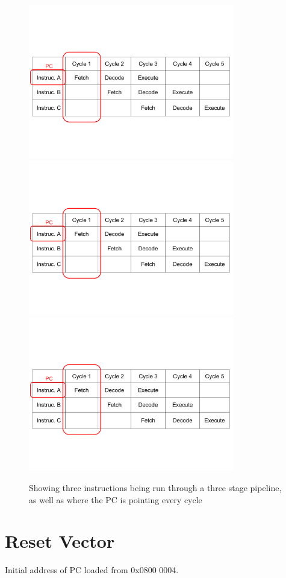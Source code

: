 \begin{figure}
  \centering
\includegraphics[page=1, clip=true, trim=1mm 40mm 1mm 57mm, width=0.8\textwidth]{./week2/pipeline}
\includegraphics[page=2, clip=true, trim=1mm 40mm 1mm 57mm, width=0.8\textwidth]{./week2/pipeline}
\includegraphics[page=3, clip=true, trim=1mm 40mm 1mm 57mm, width=0.8\textwidth]{./week2/pipeline}
\caption{Showing three instructions being run through a three stage pipeline, as well as where the PC is pointing every cycle}
\label{fig:pipeline}
\end{figure}

\section{Reset Vector}
Initial address of PC loaded from 0x0800 0004. 
